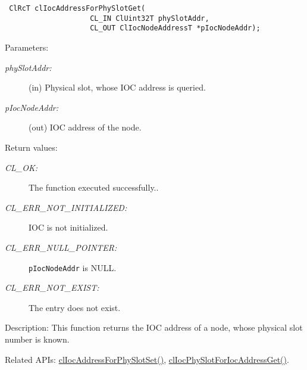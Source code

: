 \begin{flushleft}
\begin{Desc}
\footnotesize\begin{verbatim} ClRcT clIocAddressForPhySlotGet( 
                    CL_IN ClUint32T phySlotAddr, 
                    CL_OUT ClIocNodeAddressT *pIocNodeAddr); 
\end{verbatim}
\normalsize
\end{Desc}
\begin{Desc}
\item[Parameters:]
\begin{description}
\item[{\em phy\-Slot\-Addr:}](in) Physical slot, whose IOC address is queried. 
\item[{\em p\-Ioc\-Node\-Addr:}](out) IOC address of the node. \end{description}
\end{Desc}
\begin{Desc}
\item[Return values:]
\begin{description}
\item[{\em CL\_\-OK:}] The function executed successfully.. 
\item[{\em CL\_\-ERR\_\-NOT\_\-INITIALIZED:}]IOC is not initialized.
\item[{\em CL\_\-ERR\_\-NULL\_\-POINTER:}]{\tt{p\-Ioc\-Node\-Addr}} is NULL. 
\item[{\em CL\_\-ERR\_\-NOT\_\-EXIST:}]The entry does not exist.
\end{description}
\end{Desc}
\begin{Desc}
\item[Description: ]This function returns the IOC address of a node, whose physical slot number is known.\end{Desc}
\begin{Desc}
\item[Related APIs:]\hyperlink{pageIOC129}{clIocAddressForPhySlotSet()}, \hyperlink{pageIOC130}{clIocPhySlotForIocAddressGet()}. \end{Desc}

\newpage




\end{flushleft}
